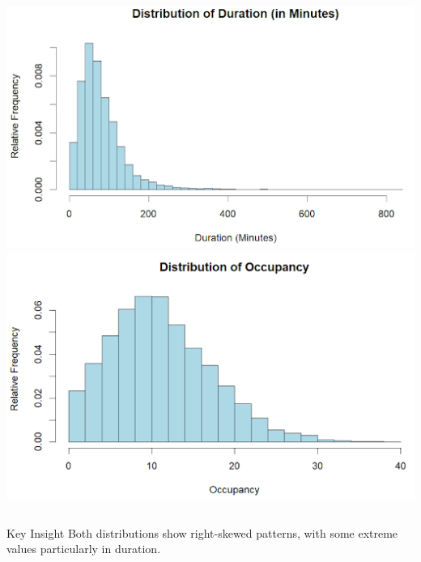 \documentclass{beamer}
\begin{document}
\begin{frame}
\begin{columns}[T]
            \includegraphics[width=\textwidth, height=0.46\textheight]{images/eda/dist_duration.png}
            \vspace{0.3cm}
            \includegraphics[width=\textwidth, height=0.41\textheight]{images/eda/dist_occupancy.png}
        \end{columns}
    
        \begin{alertblock}{Key Insight}
            Both distributions show right-skewed patterns, with some extreme values particularly in duration.
        \end{alertblock}
\end{frame}


\end{document}
